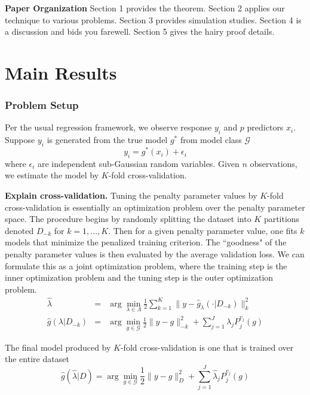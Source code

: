 \documentclass[12pt]{article}
\begin{document}
\textbf{Paper Organization}
Section 1 provides the theorem. Section 2 applies our technique to various problems. Section 3 provides simulation studies. Section 4 is a discussion and bids you farewell. Section 5 gives the hairy proof details.

\section{Main Results}

\subsubsection{Problem Setup}
Per the usual regression framework, we observe response $y_i$ and $p$ predictors $x_i$. Suppose $y_i$ is generated from the true model $g^*$ from model class $\mathcal{G}$
\begin{equation}
y_i = g^*(x_i) + \epsilon_i
\end{equation}
where $\epsilon_i$ are independent sub-Gaussian random variables. Given $n$ observations, we estimate the model by $K$-fold cross-validation.

\textbf{Explain cross-validation.}
Tuning the penalty parameter values by $K$-fold cross-validation is essentially an optimization problem over the penalty parameter space. The procedure begins by randomly splitting the dataset into $K$ partitions denoted $D_{-k}$ for $k=1,...,K$. Then for a given penalty parameter value, one fits $k$ models that minimize the penalized training criterion. The ``goodness" of the penalty parameter values is then evaluated by the average validation loss. We can formulate this as a joint optimization problem, where the training step is the inner optimization problem and the tuning step is the outer optimization problem.
\begin{eqnarray}
\hat{\lambda} &=& \arg\min_{\lambda\in\Lambda} \frac{1}{2} \sum_{k=1}^K  \| y-\hat{g}_{\lambda}(\cdot| D_{-k}) \|_{k}^{2} \\
\hat{g}(\lambda | D_{-k})&=&\arg\min_{g\in\mathcal{G}} \frac{1}{2} \| y-g \|_{-k}^{2} + \sum_{j=1}^J \lambda_j P_j^{v_j}(g)
\end{eqnarray}

The final model produced by $K$-fold cross-validation is one that is trained over the entire dataset
\begin{equation}
\hat{g}(\hat{\lambda} | D) = \arg\min_{g\in\mathcal{G}} \frac{1}{2} \| y-g \|_{D}^{2} + \sum_{j=1}^J \hat{\lambda}_j P_j^{v_j}(g)
\end{equation}
\end{document}
